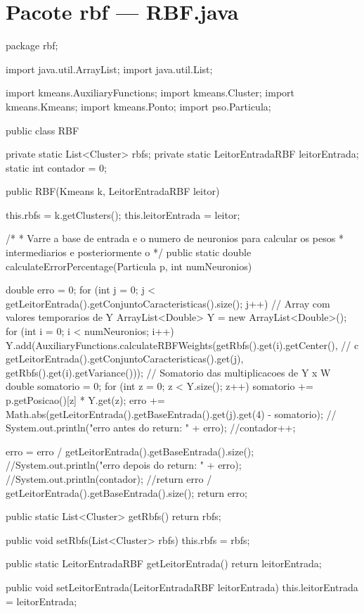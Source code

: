 \documentclass[10pt,twocolumn,letterpaper]{article}
\begin{document}
\section*{Pacote rbf --- RBF.java}

\begin{spverbatim}
package rbf;

import java.util.ArrayList;
import java.util.List;

import kmeans.AuxiliaryFunctions;
import kmeans.Cluster;
import kmeans.Kmeans;
import kmeans.Ponto;
import pso.Particula;

public class RBF {
	private static List<Cluster> rbfs;
	private static LeitorEntradaRBF leitorEntrada;
	static int contador = 0;

	public RBF(Kmeans k, LeitorEntradaRBF leitor) {
		this.rbfs = k.getClusters();
		this.leitorEntrada = leitor;
		
	}

	/*
	 * Varre a base de entrada e o numero de neuronios para calcular os pesos
	 * intermediarios e posteriormente o %
	 */
	public static double calculateErrorPercentage(Particula p, int numNeuronios) {
		double erro = 0;
		for (int j = 0; j < getLeitorEntrada().getConjuntoCaracteristicas().size(); j++) {
			// Array com valores temporarios de Y
			ArrayList<Double> Y = new ArrayList<Double>();
			for (int i = 0; i < numNeuronios; i++) {
				Y.add(AuxiliaryFunctions.calculateRBFWeights(getRbfs().get(i).getCenter(), // c
						getLeitorEntrada().getConjuntoCaracteristicas().get(j),
						getRbfs().get(i).getVariance()));
			}
			// Somatorio das multiplicacoes de Y x W
			double somatorio = 0;
			for (int z = 0; z < Y.size(); z++) {
				somatorio += p.getPosicao()[z] * Y.get(z);
			}
			erro += Math.abs(getLeitorEntrada().getBaseEntrada().get(j).get(4) - somatorio);
			// System.out.println("erro antes do return: " + erro);
		}
		//contador++;
		
		erro = erro / getLeitorEntrada().getBaseEntrada().size();
		//System.out.println("erro depois do return: " + erro);
		//System.out.println(contador);
		//return erro / getLeitorEntrada().getBaseEntrada().size();
		return erro;
	}

	public static List<Cluster> getRbfs() {
		return rbfs;
	}

	public void setRbfs(List<Cluster> rbfs) {
		this.rbfs = rbfs;
	}

	public static LeitorEntradaRBF getLeitorEntrada() {
		return leitorEntrada;
	}

	public void setLeitorEntrada(LeitorEntradaRBF leitorEntrada) {
		this.leitorEntrada = leitorEntrada;
	}

}
\end{spverbatim}
\end{document}
